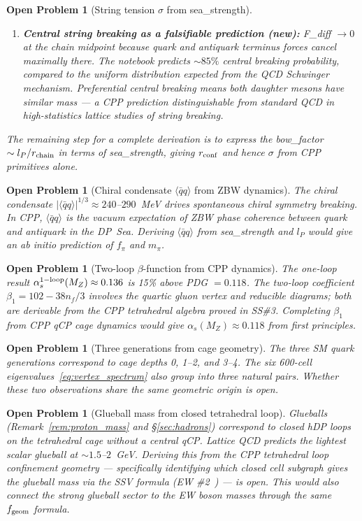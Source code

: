 \documentclass[11pt,letterpaper]{article}
\newtheorem{openprob}[theorem]{Open Problem}
\newcommand{\lP}{l_P}
\newcommand{\as}{\alpha_s}
\newcommand{\qqbar}{\langle\bar{q}q\rangle}
\begin{document}
\begin{openprob}[String tension $\sigma$ from sea\_strength]
\begin{enumerate}
\item \textbf{Central string breaking as a falsifiable prediction
  (new):}
  F\_diff $\to 0$ at the chain midpoint because quark and antiquark
  terminus forces cancel maximally there.  The notebook predicts
  $\sim 85\%$ central breaking probability, compared to the uniform
  distribution expected from the QCD Schwinger mechanism.
  Preferential central breaking means both daughter mesons have
  similar mass --- a CPP prediction distinguishable from standard
  QCD in high-statistics lattice studies of string breaking.
\end{enumerate}

The remaining step for a complete derivation is to express the
bow\_factor $\sim \lP/r_{\rm chain}$ in terms of sea\_strength,
giving $r_{\rm conf}$ and hence $\sigma$ from CPP primitives alone.
\end{openprob}

\begin{openprob}[Chiral condensate $\qqbar$ from ZBW dynamics]
\label{op:qqbar}
The chiral condensate $|\qqbar|^{1/3} \approx 240$--$290$~MeV
drives spontaneous chiral symmetry breaking.  In CPP, $\qqbar$ is
the vacuum expectation of ZBW phase coherence between quark and
antiquark in the DP~Sea.  Deriving $\qqbar$ from sea\_strength
and $\lP$ would give an ab initio prediction of $f_\pi$ and $m_\pi$.
\end{openprob}

\begin{openprob}[Two-loop $\beta$-function from CPP dynamics]
\label{op:alphas}
The one-loop result $\as^{\rm 1-loop}(M_Z) \approx 0.136$ is 15\%
above PDG $= 0.118$.  The two-loop coefficient $\beta_1 = 102 -
38n_f/3$ involves the quartic gluon vertex and reducible diagrams;
both are derivable from the CPP tetrahedral algebra proved in SS\#3.
Completing $\beta_1$ from CPP qCP cage dynamics would give
$\as(M_Z) \approx 0.118$ from first principles.
\end{openprob}

\begin{openprob}[Three generations from cage geometry]
\label{op:generations}
The three SM quark generations correspond to cage depths 0, 1--2,
and 3--4.  The six 600-cell eigenvalues~\eqref{eq:vertex_spectrum}
also group into three natural pairs.  Whether these two observations
share the same geometric origin is open.
\end{openprob}

\begin{openprob}[Glueball mass from closed tetrahedral loop]
\label{op:glueball}
Glueballs (Remark~\ref{rem:proton_mass} and \S\ref{sec:hadrons})
correspond to closed hDP loops on the tetrahedral cage without a
central qCP.  Lattice QCD predicts the lightest scalar glueball at
$\sim1.5$--$2$~GeV.  Deriving this from the CPP tetrahedral loop
confinement geometry --- specifically identifying which closed cell
subgraph gives the glueball mass via the SSV formula (EW
\#2~\citep{cpp_ew2}) --- is open.  This would also connect the
strong glueball sector to the EW boson masses through the same
$f_{\rm geom}$ formula.
\end{openprob}
\end{document}
